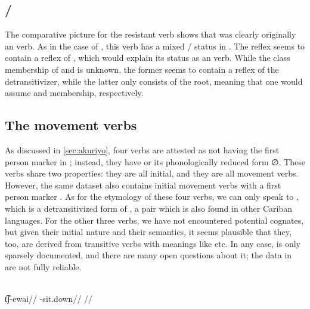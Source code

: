 

\subsection{\trio {}/ }
\label{sec:shit}
The comparative picture for the resistant \trio {} verb   shows that  was clearly originally an  verb.
As in the case of  , this verb has a mixed / status in \wayana.
The \bakairi reflex  seems to contain a reflex of , which would explain its status as an  verb.
While the class membership of \panare {} and   is unknown, the former seems to contain a reflex of the detransitivizer, while the latter only consists of the root, meaning that one would assume  and  membership, respectively.



\subsection{The \akuriyo movement verbs}
\label{sec:movement}
As discussed in \cref{sec:akuriyo}, four \akuriyo {} verbs are attested as not having the first person marker  in \textcite{gildea1994akuriyo}; instead, they have  or its phonologically reduced form ∅.
These verbs share two properties: they are all initial, and they are all movement verbs.
However, the same dataset also contains initial movement verbs with a first person marker  .
As for the etymology of these four verbs, we can only speak to  , which is a detransitivized form of  , a pair which is also found in other Cariban languages.
For the other three verbs, we have not encountered potential cognates, but given their initial nature and their semantics, it seems plausible that they, too, are derived from transitive verbs with meanings like  etc.
In any case, \akuriyo is only sparsely documented, and there are many open questions about it; the \akuriyo data in \textcite{gildea1994akuriyo} are not fully reliable.

\akuriyo \parencite[][84]{gildea1994akuriyo}\\
\begingl
\gla t͡ʃ-ewai//
\glb {}-sit.down//
\glft {}//
\endgl
\xe

